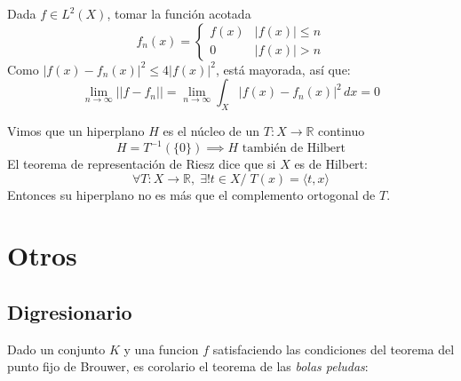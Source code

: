 \documentclass{book}
\begin{document}
\begin{teorema}[$B(X)$ es denso en $L^2(X)$]
    Dada $f \in L^2(X)$, tomar la funci\'on acotada
    $$f_n(x) =
    \begin{cases}
        f(x)    & |f(x)| \leq n\\
        0       & |f(x)| > n
    \end{cases}
    $$
    Como $|f(x) - f_n(x)|^2 \leq 4|f(x)|^2$, est\'a mayorada, as\'i que:
    $$
    \lim_{n\to\infty}||f - f_n|| = \lim_{n\to\infty} \int_X |f(x) - f_n(x)|^2\,dx = 0
    $$
\end{teorema}
\begin{teorema}
    Vimos que un hiperplano $H$ es el n\'ucleo de un $T: X \to \mathbb{R}$ continuo
    $$H = T^{-1}(\{0\}) \implies H\text{ tambi\'en de Hilbert}$$
    El teorema de representaci\'on de Riesz dice que si $X$ es de Hilbert:
    $$\forall T: X \to \mathbb{R},\; \exists ! t \in X /\; T(x) = \langle t, x \rangle$$
    Entonces su hiperplano no es m\'as que el complemento ortogonal de $T$.
\end{teorema}

\chapter{Otros}
\section{Digresionario}
\begin{teorema}
    Dado un conjunto $K$ y una funcion $f$ satisfaciendo las condiciones del teorema del punto fijo de Brouwer,
    es corolario el teorema de las \textit{bolas peludas}:
\end{teorema}
\end{document}
